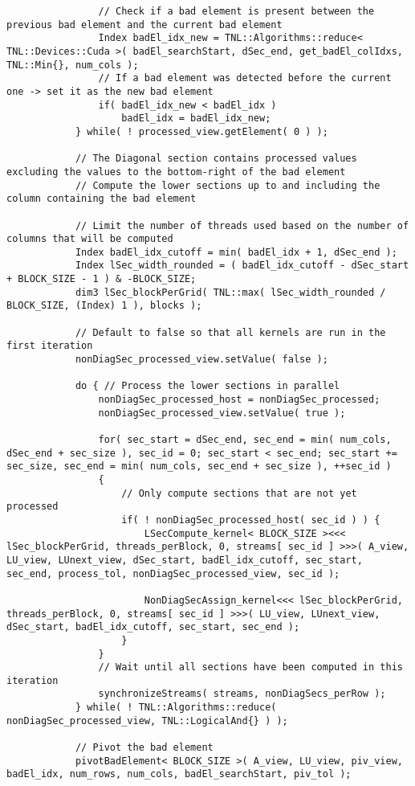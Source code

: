 \begin{lstlisting}
				// Check if a bad element is present between the previous bad element and the current bad element
				Index badEl_idx_new = TNL::Algorithms::reduce< TNL::Devices::Cuda >( badEl_searchStart, dSec_end, get_badEl_colIdxs, TNL::Min{}, num_cols );
				// If a bad element was detected before the current one -> set it as the new bad element
				if( badEl_idx_new < badEl_idx )
					badEl_idx = badEl_idx_new;
			} while( ! processed_view.getElement( 0 ) );
			
			// The Diagonal section contains processed values excluding the values to the bottom-right of the bad element
			// Compute the lower sections up to and including the column containing the bad element
			
			// Limit the number of threads used based on the number of columns that will be computed
			Index badEl_idx_cutoff = min( badEl_idx + 1, dSec_end );
			Index lSec_width_rounded = ( badEl_idx_cutoff - dSec_start + BLOCK_SIZE - 1 ) & -BLOCK_SIZE;
			dim3 lSec_blockPerGrid( TNL::max( lSec_width_rounded / BLOCK_SIZE, (Index) 1 ), blocks );
			
			// Default to false so that all kernels are run in the first iteration
			nonDiagSec_processed_view.setValue( false );
			
			do { // Process the lower sections in parallel
				nonDiagSec_processed_host = nonDiagSec_processed;
				nonDiagSec_processed_view.setValue( true );
				
				for( sec_start = dSec_end, sec_end = min( num_cols, dSec_end + sec_size ), sec_id = 0; sec_start < sec_end; sec_start += sec_size, sec_end = min( num_cols, sec_end + sec_size ), ++sec_id )
				{
					// Only compute sections that are not yet processed
					if( ! nonDiagSec_processed_host( sec_id ) ) {
						LSecCompute_kernel< BLOCK_SIZE ><<< lSec_blockPerGrid, threads_perBlock, 0, streams[ sec_id ] >>>( A_view, LU_view, LUnext_view, dSec_start, badEl_idx_cutoff, sec_start, sec_end, process_tol, nonDiagSec_processed_view, sec_id );
						
						NonDiagSecAssign_kernel<<< lSec_blockPerGrid, threads_perBlock, 0, streams[ sec_id ] >>>( LU_view, LUnext_view, dSec_start, badEl_idx_cutoff, sec_start, sec_end );
					}
				}
				// Wait until all sections have been computed in this iteration
				synchronizeStreams( streams, nonDiagSecs_perRow );
			} while( ! TNL::Algorithms::reduce( nonDiagSec_processed_view, TNL::LogicalAnd{} ) );
			
			// Pivot the bad element
			pivotBadElement< BLOCK_SIZE >( A_view, LU_view, piv_view, badEl_idx, num_rows, num_cols, badEl_searchStart, piv_tol );
			

\end{lstlisting}

